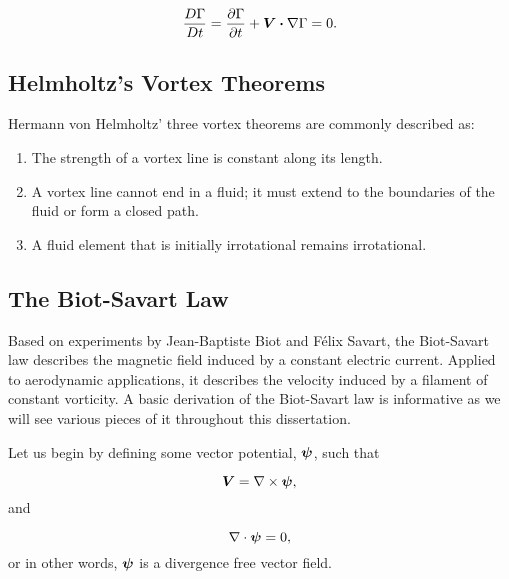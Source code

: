 \begin{equation}
	\frac{D\Gamma}{Dt} = \frac{\partial \Gamma}{\partial t} + \bm{V} \boldsymbol{\cdot} \nabla \Gamma = 0.
\end{equation}





\subsection{Helmholtz's Vortex Theorems}

Hermann von Helmholtz' three vortex theorems are commonly described as:

\begin{enumerate}
	\item The strength of a vortex line is constant along its length.
	\item A vortex line cannot end in a fluid; it must extend to the boundaries of the fluid or form a closed path.
	\item A fluid element that is initially irrotational remains irrotational.
\end{enumerate}





\subsection{The Biot-Savart Law}

Based on experiments by Jean-Baptiste Biot and F\'elix Savart, the Biot-Savart law describes the magnetic field induced by a constant electric current.
%
Applied to aerodynamic applications, it describes the velocity induced by a filament of constant vorticity.
%
A basic derivation of the Biot-Savart law is informative as we will see various pieces of it throughout this dissertation.

Let us begin by defining some vector potential, \(\bm{\psi}\), such that

\begin{equation}
    \label{eqn:velfromstream}
    \bm{V} = \nabla \times \bm{\psi},
\end{equation}
%
and

\begin{equation}
    \label{eqn:divfree}
    \nabla \cdot \bm{\psi} = 0,
\end{equation}
%
or in other words, \(\bm{\psi}\) is a divergence free vector field.

